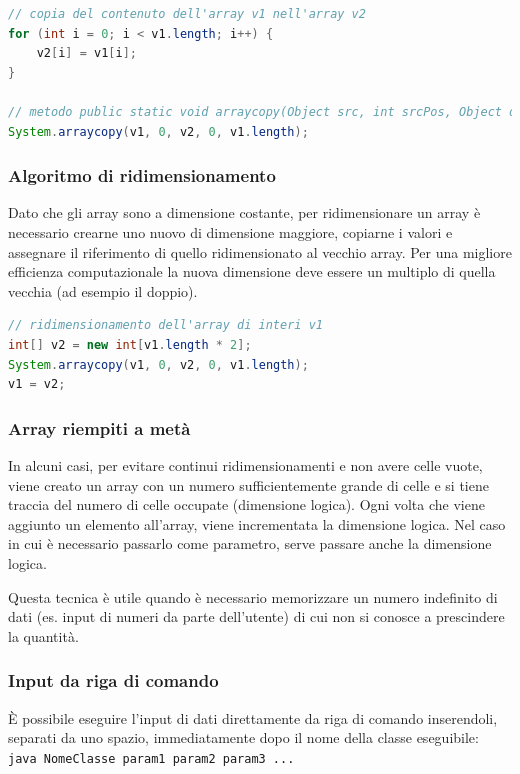 \documentclass[a4paper]{article}
\begin{document}
\begin{lstlisting}[language=Java]
// copia del contenuto dell'array v1 nell'array v2
for (int i = 0; i < v1.length; i++) {
	v2[i] = v1[i];
}

// metodo public static void arraycopy(Object src, int srcPos, Object dest, int destPos, int length)
System.arraycopy(v1, 0, v2, 0, v1.length);
\end{lstlisting}

\subsubsection*{Algoritmo di ridimensionamento}
Dato che gli array sono a dimensione costante, per ridimensionare un array è necessario crearne uno nuovo di dimensione maggiore,
copiarne i valori e assegnare il riferimento di quello ridimensionato al vecchio array. Per una migliore efficienza computazionale
la nuova dimensione deve essere un multiplo di quella vecchia (ad esempio il doppio).

\begin{lstlisting}[language=Java]
// ridimensionamento dell'array di interi v1
int[] v2 = new int[v1.length * 2];
System.arraycopy(v1, 0, v2, 0, v1.length);
v1 = v2;
\end{lstlisting}

\subsubsection*{Array riempiti a metà}
In alcuni casi, per evitare continui ridimensionamenti e non avere celle vuote, viene creato un array con un numero sufficientemente
grande di celle e si tiene traccia del numero di celle occupate (dimensione logica). Ogni volta che viene aggiunto un elemento
all'array, viene incrementata la dimensione logica. Nel caso in cui è necessario passarlo come parametro, serve passare anche
la dimensione logica.

Questa tecnica è utile quando è necessario memorizzare un numero indefinito di dati (es. input di numeri da parte dell'utente)
di cui non si conosce a prescindere la quantità.

\subsubsection*{Input da riga di comando}
È possibile eseguire l'input di dati direttamente da riga di comando inserendoli, separati da uno spazio, immediatamente dopo
il nome della classe eseguibile: \verb|java NomeClasse param1 param2 param3 ...|
\end{document}
